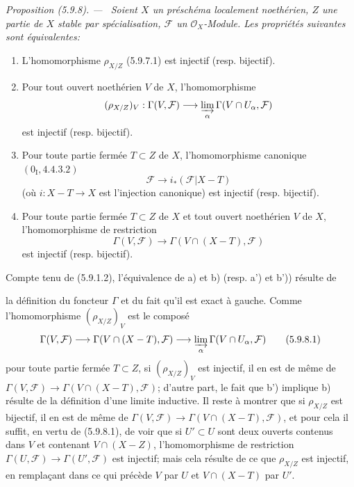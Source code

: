 \documentclass[10pt,oneside]{book}
\makeatletter
\newcommand{\oldpage}[2][]{%
  \setcounter{footnote}{0}%
  \marginpar{\scriptsize\textbf{#1}~|~#2}\ignorespaces}
\newenvironment{proposition}[1][]{%
  \par\medskip\noindent\itshape Proposition (#1). ---\ }{\par}
\newcommand{\EGAReaderTarget}[2]{\hypertarget{#1}{}\@bsphack\begingroup\def\@currentHref{#1}\label{#2}\endgroup\@esphack}
\makeatother
\begin{document}
\begin{proposition}[5.9.8]
\EGAReaderTarget{ega4.c04.prop.5-9-8}{IV.2.s5.9.8-fr}
Soient $X$ un préschéma localement noethérien, $Z$ une partie de $X$ stable
par spécialisation, $\mathcal F$ un $\mathcal O_X$-Module. Les propriétés
suivantes sont équivalentes:
\begin{enumerate}
\item[a)] L'homomorphisme $\rho_{X/Z}$ (5.9.7.1) est injectif
(resp. bijectif).
\item[b)] Pour tout ouvert noethérien $V$ de $X$, l'homomorphisme
\[
(\rho_{X/Z})_V:\Gamma(V,\mathcal F)\longrightarrow
\varinjlim_\alpha\Gamma(V\cap U_\alpha,\mathcal F)
\]
est injectif (resp. bijectif).
\item[a')] Pour toute partie fermée $T\subset Z$ de $X$, l'homomorphisme
canonique $(0_{\mathrm I},4.4.3.2)$
\[
\mathcal F\longrightarrow i_*(\mathcal F|X-T)
\]
(où $i:X-T\to X$ est l'injection canonique) est injectif
(resp. bijectif).
\item[b')] Pour toute partie fermée $T\subset Z$ de $X$ et tout ouvert
noethérien $V$ de $X$, l'homomorphisme de restriction
\[
\Gamma(V,\mathcal F)\longrightarrow
\Gamma(V\cap(X-T),\mathcal F)
\]
est injectif (resp. bijectif).
\end{enumerate}
\end{proposition}

Compte tenu de (5.9.1.2), l'équivalence de a) et b) (resp. a') et b'))
résulte de
\oldpage[IV-2]{112}

la définition du foncteur $\Gamma$ et du fait qu'il est exact à gauche.
Comme l'homomorphisme $(\rho_{X/Z})_V$ est le composé
\begin{equation}
\Gamma(V,\mathcal F)\longrightarrow
\Gamma(V\cap(X-T),\mathcal F)\longrightarrow
\varinjlim_\alpha\Gamma(V\cap U_\alpha,\mathcal F)
\tag{5.9.8.1}\label{IV.2.s5.9.8.1-fr}
\end{equation}
pour toute partie fermée $T\subset Z$, si $(\rho_{X/Z})_V$ est injectif, il
en est de même de
$\Gamma(V,\mathcal F)\to\Gamma(V\cap(X-T),\mathcal F)$; d'autre part, le
fait que b') implique b) résulte de la définition d'une limite inductive. Il
reste à montrer que si $\rho_{X/Z}$ est bijectif, il en est de même de
$\Gamma(V,\mathcal F)\to\Gamma(V\cap(X-T),\mathcal F)$, et pour cela il
suffit, en vertu de (5.9.8.1), de voir que si $U'\subset U$ sont deux
ouverts contenus dans $V$ et contenant $V\cap(X-Z)$, l'homomorphisme de
restriction $\Gamma(U,\mathcal F)\to\Gamma(U',\mathcal F)$ est injectif;
mais cela résulte de ce que $\rho_{X/Z}$ est injectif, en remplaçant dans ce
qui précède $V$ par $U$ et $V\cap(X-T)$ par $U'$.
\end{document}
